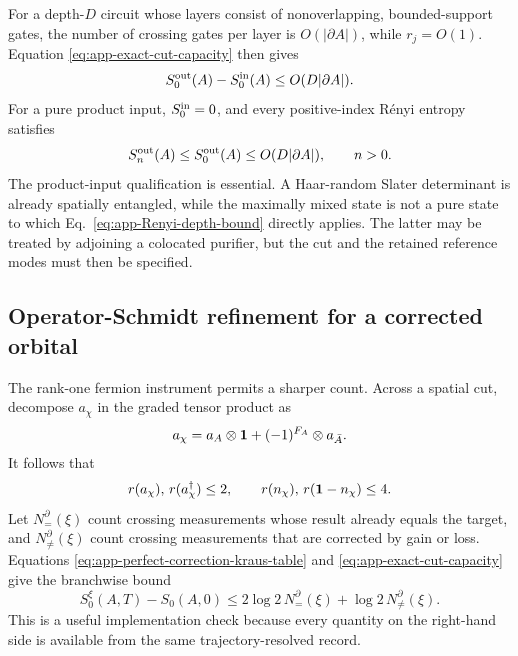 For a depth-\(D\) circuit whose layers consist of nonoverlapping,
bounded-support gates, the number of crossing gates per layer is
\(O(|\partial A|)\), while \(r_j=O(1)\).  Equation
\eqref{eq:app-exact-cut-capacity} then gives
\begin{equation}
    S_0^{\rm out}(A)-S_0^{\rm in}(A)
    \le O(D|\partial A|).
    \label{eq:app-Lu-area-depth-bound}
\end{equation}
For a pure product input, \(S_0^{\rm in}=0\), and every positive-index
R\'enyi entropy satisfies
\begin{equation}
    S_n^{\rm out}(A)\le S_0^{\rm out}(A)
    \le O(D|\partial A|),\qquad n>0.
    \label{eq:app-Renyi-depth-bound}
\end{equation}
The product-input qualification is essential.  A Haar-random Slater
determinant is already spatially entangled, while the maximally mixed state
is not a pure state to which Eq.~\eqref{eq:app-Renyi-depth-bound} directly
applies.  The latter may be treated by adjoining a colocated purifier, but
the cut and the retained reference modes must then be specified.

\subsection{Operator-Schmidt refinement for a corrected orbital}

The rank-one fermion instrument permits a sharper count.  Across a spatial
cut, decompose \(a_\chi\) in the graded tensor product as
\begin{equation}
    a_\chi=a_A\otimes\mathbf{1}+(-1)^{F_A}\otimes a_{\bar A}.
    \label{eq:app-fermion-cut-decomposition}
\end{equation}
It follows that
\begin{equation}
    r(a_\chi),\,r(a_\chi^\dagger)\le2,
    \qquad
    r(n_\chi),\,r(\mathbf{1}-n_\chi)\le4.
    \label{eq:app-branch-operator-schmidt-ranks}
\end{equation}
Let \(N_=^\partial(\xi)\) count crossing measurements whose result already
equals the target, and \(N_{\ne}^\partial(\xi)\) count crossing measurements
that are corrected by gain or loss.  Equations
\eqref{eq:app-perfect-correction-kraus-table} and
\eqref{eq:app-exact-cut-capacity} give the branchwise bound
\begin{equation}
    \boxed{
    S_0^\xi(A,T)-S_0(A,0)
    \le 2\log2\,N_=^\partial(\xi)
      +\log2\,N_{\ne}^\partial(\xi).}
    \label{eq:app-record-resolved-cut-bound}
\end{equation}
This is a useful implementation check because every quantity on the
right-hand side is available from the same trajectory-resolved record.

